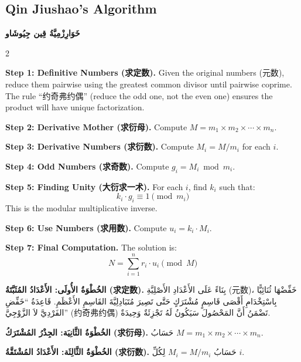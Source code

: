 \documentclass[11pt,a4paper]{article}
\newcommand{\ar}[1]{\arabicfont\beginR #1\endR}
\newcommand{\zhtext}[1]{{\chinese #1}}
\newenvironment{bilingual}{%
  \begin{paracol}{2}
}{%
  \end{paracol}
}
\begin{document}
\vspace{1em}

\subsection{Qin Jiushao's Algorithm}
\ar{\textbf{خَوَارِزْمِيَّةُ قِين جِيُوشَاو}}

\begin{bilingual}

\begin{leftcolumn*}
\textbf{Step 1: Definitive Numbers (\zhtext{求定数}).} Given the original numbers (\zhtext{元数}), reduce them pairwise using the greatest common divisor until pairwise coprime. The rule ``\zhtext{约奇弗约偶}'' (reduce the odd one, not the even one) ensures the product will have unique factorization.

\textbf{Step 2: Derivative Mother (\zhtext{求衍母}).} Compute $M = m_1 \times m_2 \times \cdots \times m_n$.

\textbf{Step 3: Derivative Numbers (\zhtext{求衍数}).} Compute $M_i = M / m_i$ for each $i$.

\textbf{Step 4: Odd Numbers (\zhtext{求奇数}).} Compute $g_i = M_i \bmod m_i$.

\textbf{Step 5: Finding Unity (\zhtext{大衍求一术}).} For each $i$, find $k_i$ such that:
\[k_i \cdot g_i \equiv 1 \pmod{m_i}\]
This is the modular multiplicative inverse.

\textbf{Step 6: Use Numbers (\zhtext{求用数}).} Compute $u_i = k_i \cdot M_i$.

\textbf{Step 7: Final Computation.} The solution is:
\[N = \sum_{i=1}^{n} r_i \cdot u_i \pmod{M}\]
\end{leftcolumn*}

\begin{rightcolumn*}
\ar{\textbf{الخُطْوَةُ الأُولَى: الأَعْدَادُ المُثَبَّتَةُ (求定数).} بِنَاءً عَلَى الأَعْدَادِ الأَصْلِيَّةِ (元数)، خَفِّضْهَا ثُنَائِيًّا بِاسْتِخْدَامِ أَقْصَى قَاسِمٍ مُشْتَرَكٍ حَتَّى تَصِيرَ مُتَبَادِلِيَّةَ القَاسِمِ الأَعْظَمِ. قَاعِدَةُ \enquote{خَفِّضِ الفَرْدِيَّ لاَ الزَّوْجِيَّ} (约奇弗约偶) تَضْمَنُ أَنَّ المَحْصُولَ سَيَكُونُ لَهُ تَجْزِئَةٌ وَحِيدَةٌ.}

\ar{\textbf{الخُطْوَةُ الثَّانِيَة: الجِذْرُ المُشْتَرَكُ (求衍母).} حَسَابُ $M = m_1 \times m_2 \times \cdots \times m_n$.}

\ar{\textbf{الخُطْوَةُ الثَّالِثَة: الأَعْدَادُ المُشْتَقَّةُ (求衍数).} حَسَابُ $M_i = M / m_i$ لِكُلِّ $i$.}


\end{rightcolumn*}
\end{bilingual}
\end{document}
